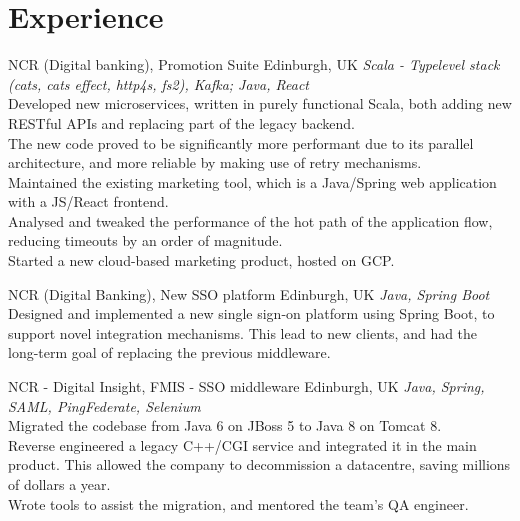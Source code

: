 \documentclass[nocolors]{curriculum-vitae}
\begin{document}
    \section{Experience}
        \vspace*{-0.3cm}
        \begin{entrylist}
             {NCR (Digital banking), Promotion Suite} {Edinburgh, UK}
            {\emph{Scala - Typelevel stack (cats, cats effect, http4s, fs2), Kafka; Java, React}
            \vspace*{0.05cm}\\
            Developed new microservices, written in purely functional Scala, both adding new RESTful APIs and replacing part of the legacy backend.\\
            The new code proved to be significantly more performant due to its parallel architecture, and more reliable by making use of retry mechanisms.\\
            Maintained the existing marketing tool, which is a Java/Spring web application with a JS/React frontend.\\
            Analysed and tweaked the performance of the hot path of the application flow, reducing timeouts by an order of magnitude.\\
            Started a new cloud-based marketing product, hosted on GCP.}
            \vspace*{0.3cm}
        
             {NCR (Digital Banking), New SSO platform} {Edinburgh, UK}
            {\emph{Java, Spring Boot}
            \vspace*{0.05cm}\\
            Designed and implemented a new single sign-on platform using Spring Boot, to support novel integration mechanisms. This lead to new clients, and had the long-term goal of replacing the previous middleware.}
            \vspace*{0.2cm}

             {NCR - Digital Insight, FMIS - SSO middleware} {Edinburgh, UK}
            {\emph{Java, Spring, SAML, PingFederate, Selenium}
            \vspace*{0.05cm}\\
            Migrated the codebase from Java 6 on JBoss 5 to Java 8 on Tomcat 8.\\
            Reverse engineered a legacy C++/CGI service and integrated it in the main product. This allowed the company to decommission a datacentre, saving millions of dollars a year.\\
            Wrote tools to assist the migration, and mentored the team's QA engineer.}
        \end{entrylist}
\end{document}
